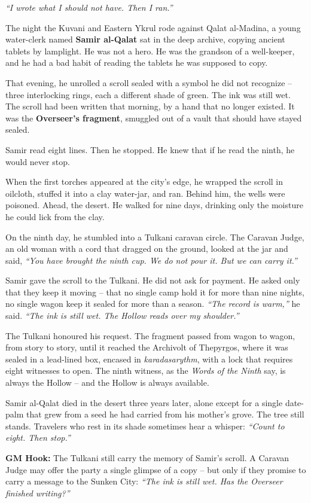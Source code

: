 \begin{tcolorbox}[colback=black!2,colframe=red!70!black,title={The Last Scribe of Qalat al-Madina},breakable]
  \textit{``I wrote what I should not have. Then I ran.''}
  
  The night the Kuvani and Eastern Ykrul rode against Qalat al-Madina, a young water-clerk named \textbf{Samir al-Qalat} sat in the deep archive, copying ancient tablets by lamplight. He was not a hero. He was the grandson of a well-keeper, and he had a bad habit of reading the tablets he was supposed to copy.
  
  That evening, he unrolled a scroll sealed with a symbol he did not recognize -- three interlocking rings, each a different shade of green. The ink was still wet. The scroll had been written that morning, by a hand that no longer existed. It was the \textbf{Overseer's fragment}, smuggled out of a vault that should have stayed sealed.
  
  Samir read eight lines. Then he stopped. He knew that if he read the ninth, he would never stop.
  
  When the first torches appeared at the city's edge, he wrapped the scroll in oilcloth, stuffed it into a clay water-jar, and ran. Behind him, the wells were poisoned. Ahead, the desert. He walked for nine days, drinking only the moisture he could lick from the clay.
  
  On the ninth day, he stumbled into a Tulkani caravan circle. The Caravan Judge, an old woman with a cord that dragged on the ground, looked at the jar and said, \textit{``You have brought the ninth cup. We do not pour it. But we can carry it.''}
  
  Samir gave the scroll to the Tulkani. He did not ask for payment. He asked only that they keep it moving -- that no single camp hold it for more than nine nights, no single wagon keep it sealed for more than a season. \textit{``The record is warm,''} he said. \textit{``The ink is still wet. The Hollow reads over my shoulder.''}
  
  The Tulkani honoured his request. The fragment passed from wagon to wagon, from story to story, until it reached the Archivolt of Thepyrgos, where it was sealed in a lead-lined box, encased in \textit{karadasarythm}, with a lock that requires eight witnesses to open. The ninth witness, as the \textit{Words of the Ninth} say, is always the Hollow -- and the Hollow is always available.
  
  Samir al-Qalat died in the desert three years later, alone except for a single date-palm that grew from a seed he had carried from his mother's grove. The tree still stands. Travelers who rest in its shade sometimes hear a whisper: \textit{``Count to eight. Then stop.''}
  
  \vspace{2mm}
  \textbf{GM Hook:} The Tulkani still carry the memory of Samir's scroll. A Caravan Judge may offer the party a single glimpse of a copy -- but only if they promise to carry a message to the Sunken City: \textit{``The ink is still wet. Has the Overseer finished writing?''}
  \end{tcolorbox}

